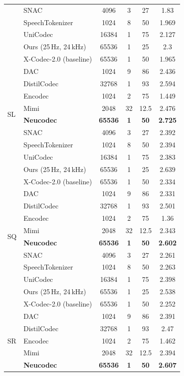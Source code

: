 \documentclass[preprint]{article}
\begin{document}
\begin{longtable}{llcccc}
  & SNAC & 4096 & 3 & 27 & 1.83 \\
  & SpeechTokenizer & 1024 & 8 & 50 & 1.969 \\
  & UniCodec & 16384 & 1 & 75 & 2.127 \\
  & Ours (25\,Hz, 24\,kHz) & 65536 & 1 & 25 & 2.3 \\
  & X-Codec-2.0 (baseline) & 65536 & 1 & 50 & 1.965 \\
\midrule
\multirow{8}{*}{SL}
  & DAC & 1024 & 9 & 86 & 2.436 \\
  & DistilCodec & 32768 & 1 & 93 & 2.594 \\
  & Encodec & 1024 & 2 & 75 & 1.449 \\
  & Mimi & 2048 & 32 & 12.5 & 2.476 \\
  & \textbf{Neucodec} & \textbf{65536} & \textbf{1} & \textbf{50} & \textbf{2.725} \\
  & SNAC & 4096 & 3 & 27 & 2.392 \\
  & SpeechTokenizer & 1024 & 8 & 50 & 2.394 \\
  & UniCodec & 16384 & 1 & 75 & 2.383 \\
  & Ours (25\,Hz, 24\,kHz) & 65536 & 1 & 25 & 2.639 \\
  & X-Codec-2.0 (baseline) & 65536 & 1 & 50 & 2.334 \\
\midrule
\multirow{8}{*}{SQ}
  & DAC & 1024 & 9 & 86 & 2.331 \\
  & DistilCodec & 32768 & 1 & 93 & 2.501 \\
  & Encodec & 1024 & 2 & 75 & 1.36 \\
  & Mimi & 2048 & 32 & 12.5 & 2.343 \\
  & \textbf{Neucodec} & \textbf{65536} & \textbf{1} & \textbf{50} & \textbf{2.602} \\
  & SNAC & 4096 & 3 & 27 & 2.261 \\
  & SpeechTokenizer & 1024 & 8 & 50 & 2.263 \\
  & UniCodec & 16384 & 1 & 75 & 2.398 \\
  & Ours (25\,Hz, 24\,kHz) & 65536 & 1 & 25 & 2.538 \\
  & X-Codec-2.0 (baseline) & 65536 & 1 & 50 & 2.252 \\
\midrule
\multirow{8}{*}{SR}
  & DAC & 1024 & 9 & 86 & 2.391 \\
  & DistilCodec & 32768 & 1 & 93 & 2.47 \\
  & Encodec & 1024 & 2 & 75 & 1.462 \\
  & Mimi & 2048 & 32 & 12.5 & 2.394 \\
  & \textbf{Neucodec} & \textbf{65536} & \textbf{1} & \textbf{50} & \textbf{2.607} \\

\end{longtable}
\end{document}
